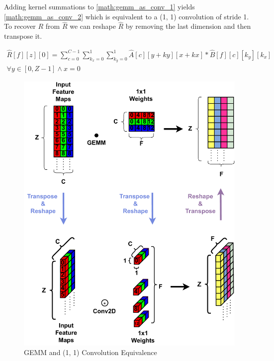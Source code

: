 Adding kernel summations to \autoref{math:gemm_as_conv_1} yields
\autoref{math:gemm_as_conv_2} which is equivalent to a (1, 1) convolution of stride
1. To recover $R$ from $\hat{R}$ we can reshape $\hat{R}$ by removing the
last dimension and then transpose it. 

\begin{equation}
    \begin{aligned}
        \hat{R}[f][z][0] = \displaystyle\sum\limits_{c=0}^{C-1}\displaystyle\sum\limits_{k_x=0}^{1} \displaystyle\sum\limits_{k_y=0}^{1}\hat{A}[c][y+ky][x+kx]*\hat{B}[f][c][k_y][k_x] \\ \forall y \in [0, Z-1] \land x = 0
    \end{aligned}
    \label{math:gemm_as_conv_2}
\end{equation}

\begin{figure}[]
    \centering
    \includegraphics[scale=0.5]{fig/GemmTo1x1Conv.pdf}
    \caption{\ac{GEMM} and (1, 1) Convolution Equivalence}
    \label{fig:gemmTo1x1Conv}
\end{figure}


